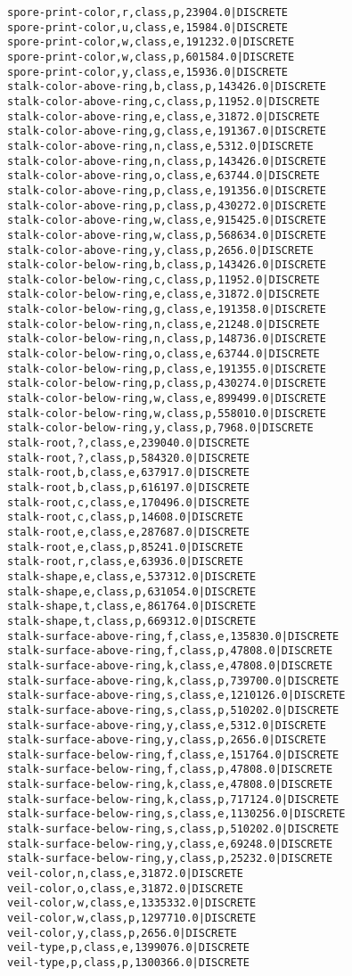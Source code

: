 \begin{lstlisting}
spore-print-color,r,class,p,23904.0|DISCRETE	
spore-print-color,u,class,e,15984.0|DISCRETE	
spore-print-color,w,class,e,191232.0|DISCRETE	
spore-print-color,w,class,p,601584.0|DISCRETE	
spore-print-color,y,class,e,15936.0|DISCRETE	
stalk-color-above-ring,b,class,p,143426.0|DISCRETE	
stalk-color-above-ring,c,class,p,11952.0|DISCRETE	
stalk-color-above-ring,e,class,e,31872.0|DISCRETE	
stalk-color-above-ring,g,class,e,191367.0|DISCRETE	
stalk-color-above-ring,n,class,e,5312.0|DISCRETE	
stalk-color-above-ring,n,class,p,143426.0|DISCRETE	
stalk-color-above-ring,o,class,e,63744.0|DISCRETE	
stalk-color-above-ring,p,class,e,191356.0|DISCRETE	
stalk-color-above-ring,p,class,p,430272.0|DISCRETE	
stalk-color-above-ring,w,class,e,915425.0|DISCRETE	
stalk-color-above-ring,w,class,p,568634.0|DISCRETE	
stalk-color-above-ring,y,class,p,2656.0|DISCRETE	
stalk-color-below-ring,b,class,p,143426.0|DISCRETE	
stalk-color-below-ring,c,class,p,11952.0|DISCRETE	
stalk-color-below-ring,e,class,e,31872.0|DISCRETE	
stalk-color-below-ring,g,class,e,191358.0|DISCRETE	
stalk-color-below-ring,n,class,e,21248.0|DISCRETE	
stalk-color-below-ring,n,class,p,148736.0|DISCRETE	
stalk-color-below-ring,o,class,e,63744.0|DISCRETE	
stalk-color-below-ring,p,class,e,191355.0|DISCRETE	
stalk-color-below-ring,p,class,p,430274.0|DISCRETE	
stalk-color-below-ring,w,class,e,899499.0|DISCRETE	
stalk-color-below-ring,w,class,p,558010.0|DISCRETE	
stalk-color-below-ring,y,class,p,7968.0|DISCRETE	
stalk-root,?,class,e,239040.0|DISCRETE	
stalk-root,?,class,p,584320.0|DISCRETE	
stalk-root,b,class,e,637917.0|DISCRETE	
stalk-root,b,class,p,616197.0|DISCRETE	
stalk-root,c,class,e,170496.0|DISCRETE	
stalk-root,c,class,p,14608.0|DISCRETE	
stalk-root,e,class,e,287687.0|DISCRETE	
stalk-root,e,class,p,85241.0|DISCRETE	
stalk-root,r,class,e,63936.0|DISCRETE	
stalk-shape,e,class,e,537312.0|DISCRETE	
stalk-shape,e,class,p,631054.0|DISCRETE	
stalk-shape,t,class,e,861764.0|DISCRETE	
stalk-shape,t,class,p,669312.0|DISCRETE	
stalk-surface-above-ring,f,class,e,135830.0|DISCRETE	
stalk-surface-above-ring,f,class,p,47808.0|DISCRETE	
stalk-surface-above-ring,k,class,e,47808.0|DISCRETE	
stalk-surface-above-ring,k,class,p,739700.0|DISCRETE	
stalk-surface-above-ring,s,class,e,1210126.0|DISCRETE	
stalk-surface-above-ring,s,class,p,510202.0|DISCRETE	
stalk-surface-above-ring,y,class,e,5312.0|DISCRETE	
stalk-surface-above-ring,y,class,p,2656.0|DISCRETE	
stalk-surface-below-ring,f,class,e,151764.0|DISCRETE	
stalk-surface-below-ring,f,class,p,47808.0|DISCRETE	
stalk-surface-below-ring,k,class,e,47808.0|DISCRETE	
stalk-surface-below-ring,k,class,p,717124.0|DISCRETE	
stalk-surface-below-ring,s,class,e,1130256.0|DISCRETE	
stalk-surface-below-ring,s,class,p,510202.0|DISCRETE	
stalk-surface-below-ring,y,class,e,69248.0|DISCRETE	
stalk-surface-below-ring,y,class,p,25232.0|DISCRETE	
veil-color,n,class,e,31872.0|DISCRETE	
veil-color,o,class,e,31872.0|DISCRETE	
veil-color,w,class,e,1335332.0|DISCRETE	
veil-color,w,class,p,1297710.0|DISCRETE	
veil-color,y,class,p,2656.0|DISCRETE	
veil-type,p,class,e,1399076.0|DISCRETE	
veil-type,p,class,p,1300366.0|DISCRETE
\end{lstlisting}

